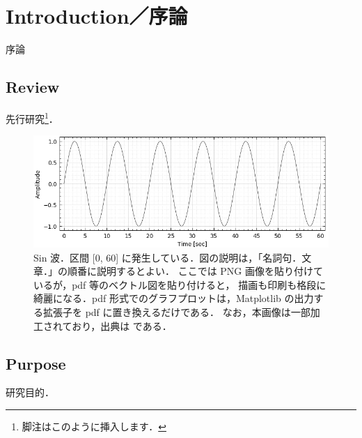 \chapter{Introduction／序論}
\label{chap_Introduction}

序論

\section{Review}
先行研究\footnote{脚注はこのように挿入します．}．

\begin{figure} %
  \centering
  \includegraphics[width=15cm]{./figs/sin.png}
  \caption{
    Sin 波．区間 [0, 60] に発生している．図の説明は，「名詞句．文章．」の順番に説明するとよい．
    ここでは PNG 画像を貼り付けているが，pdf 等のベクトル図を貼り付けると，
    描画も印刷も格段に綺麗になる．pdf 形式でのグラフプロットは，Matplotlib の出力する拡張子を pdf に置き換えるだけである．
    なお，本画像は一部加工されており，出典は \citep{ADMIS2018} である．
  }
  \label{fig_ADMIS2018}
\end{figure}

\section{Purpose}
研究目的．

